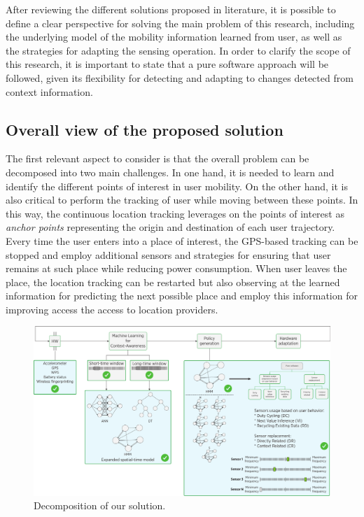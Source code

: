 \documentclass[ENG,PhD]{cinvestav}
\begin{document}
After reviewing the different solutions proposed in literature, it is possible to define a clear perspective for solving the main problem of this research, including the underlying model of the mobility information learned from user, as well as the strategies for adapting the sensing operation.
In order to clarify the scope of this research, it is important to state that a pure software approach will be followed, given its flexibility for detecting and adapting to changes detected from context information.

\subsection{Overall view of the proposed solution}

The first relevant aspect to consider is that the overall problem can be decomposed into two main challenges.
In one hand, it is needed to learn and identify the different points of interest in user mobility.
On the other hand, it is also critical to perform the tracking of user while moving between these points.
In this way, the continuous location tracking leverages on the points of interest as \emph{anchor points} representing the origin and destination of each user trajectory.
Every time the user enters into a place of interest, the GPS-based tracking can be stopped and employ additional sensors and strategies for ensuring that user remains at such place while reducing power consumption.
When user leaves the place, the location tracking can be restarted but also observing at the learned information for predicting the next possible place and employ this information for improving access the access to location providers.

\begin{figure}[t]
  \centering
  \includegraphics[width=\textwidth]{dual-taxonomy-ours}
  \caption{Decomposition of our solution.}
  \label{fig:decomposition-our-solution}
\end{figure}
\end{document}
